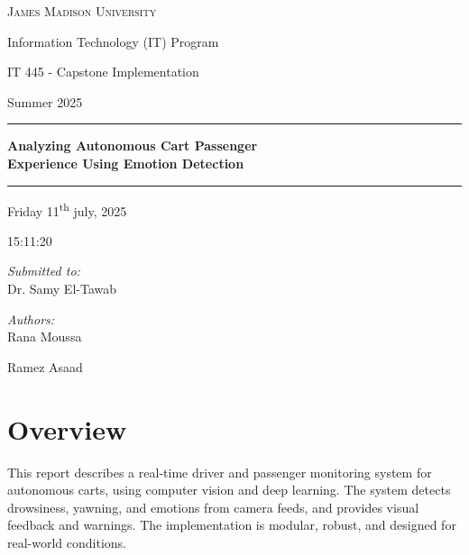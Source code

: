 \documentclass[12pt]{article}
\begin{document}
{
\begin{titlepage}
    \centering
    \vspace{1cm}
    {\Large\scshape James Madison University \par}
    \vspace{0.5cm}
    {\large Information Technology (IT) Program \par}
    {\large IT 445 - Capstone Implementation \par}
    {\large Summer 2025 \par}
    \vspace{1cm}
    \rule{\textwidth}{0.5pt}
    \vspace{0.5cm}
    {\bfseries\LARGE Analyzing Autonomous Cart Passenger\\[0.2cm]
    Experience Using Emotion Detection \par}
    \vspace{0.5cm}
    \rule{\textwidth}{0.5pt}
    \vspace{0.8cm}
    {\large Friday 11\textsuperscript{th} july, 2025 \par}
    {\large 15:11:20 \par}
    \vspace{0.5cm}
    \begin{minipage}{0.3\textwidth}
        \raggedright
        \textit{Submitted to:}\\
        Dr. Samy El-Tawab
    \end{minipage}
    \begin{minipage}{0.45\textwidth}
        \raggedleft
        \textit{Authors:}\\
        Rana Moussa \par Ramez Asaad
    \end{minipage}
    \vfill
\end{titlepage}
\restoregeometry}


\section{Overview}
This report describes a real-time driver and passenger monitoring system for autonomous carts, using computer vision and deep learning. The system detects drowsiness, yawning, and emotions from camera feeds, and provides visual feedback and warnings. The implementation is modular, robust, and designed for real-world conditions.
\end{document}
